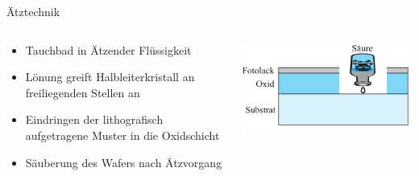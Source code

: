 \documentclass[12pt%
,aspectratio=169%
]{beamer}
\begin{document}
\begin{frame}{Ätztechnik}
\begin{columns}[T] %
\begin{column}{.58\textwidth}
\begin{itemize}
	\item Tauchbad in Ätzender Flüssigkeit
	\item Lönung greift Halbleiterkristall an freiliegenden Stellen an
	\item Eindringen der lithograﬁsch aufgetragene Muster in die Oxidschicht
	\item Säuberung des Wafers nach Ätzvorgang
\end{itemize}
\end{column}%
\hfill%
\begin{column}{.38\textwidth}
\centering
\vspace*{-1cm}
\includegraphics[scale=0.45]{pictures/aetz}
\end{column}%
\end{columns}
\end{frame}
\end{document}
